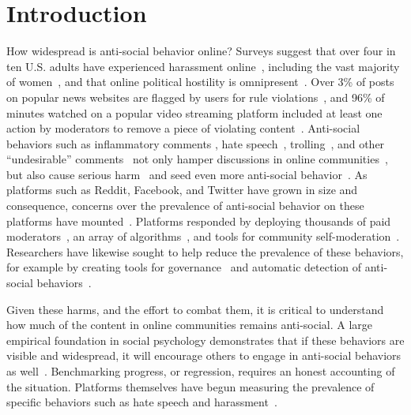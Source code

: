 \section{Introduction}
How widespread is anti-social behavior online? Surveys suggest that over four in ten U.S. adults have experienced harassment online~\cite{pew_harassment_results}, including the vast majority of women~\cite{vitak_harassment}, and that online political hostility is omnipresent~\cite{bor_hostility}. Over 3\% of posts on popular news websites are flagged by users for rule violations~\cite{cheng2017anyone}, and 96\% of minutes watched on a popular video streaming platform included at least one action by moderators to remove a piece of violating content~\cite{twitch_transparency_report}. Anti-social behaviors such as inflammatory comments \cite{1_Chandrasekharan}, hate speech~\cite{2_Donovan}, trolling~\cite{82_Claire, 83_Kayany}, and other ``undesirable'' comments~\cite{4_Chancellor, 5_Cheng, 6_Sood, 7_Chandrasekharan} not only hamper discussions in online communities~\cite{88_Kraut}, but also cause serious harm~\cite{84_Yavuz, 85_Wiener} and seed even more anti-social behavior~\cite{cheng2017anyone}. As platforms such as Reddit, Facebook, and Twitter have grown in size and consequence, concerns over the prevalence of anti-social behavior on these platforms have mounted~\cite{71_Laub}. Platforms responded by deploying thousands of paid moderators~\cite{8_Gillespie, 9_Roberts}, an array of algorithms~\cite{28_Gorwa, 11_Hosseini}, and tools for community self-moderation~\cite{seering2020reconsidering, chandrasekharan2019crossmod}. Researchers have likewise sought to help reduce the prevalence of these behaviors, for example by creating tools for governance~\cite{13_Fan,zhang2020policykit} and automatic detection of anti-social behaviors~\cite{14_Butler, 15_Xu}.

Given these harms, and the effort to combat them, it is critical to understand how much of the content in online communities remains anti-social. A large empirical foundation in social psychology demonstrates that if these behaviors are visible and widespread, it will encourage others to engage in anti-social behaviors as well~\cite{5_Cheng, cheng2017anyone}. Benchmarking progress, or regression, requires an honest accounting of the situation. Platforms themselves have begun measuring the prevalence of specific behaviors such as hate speech and harassment~\cite{58_Culliford, 77_YoutubeTeam, 78_Vincent}.


